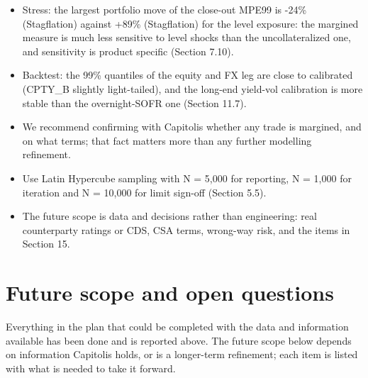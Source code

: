\documentclass[11pt,letterpaper]{article}
\begin{document}
\begin{itemize}
\item Stress: the largest portfolio move of the close-out MPE99 is -24\% (Stagflation) against +89\% (Stagflation) for the level exposure: the margined measure is much less sensitive to level shocks than the uncollateralized one, and sensitivity is product specific (Section 7.10).
\item Backtest: the 99\% quantiles of the equity and FX leg are close to calibrated (CPTY\_B slightly light-tailed), and the long-end yield-vol calibration is more stable than the overnight-SOFR one (Section 11.7).
\item We recommend confirming with Capitolis whether any trade is margined, and on what terms; that fact matters more than any further modelling refinement.
\item Use Latin Hypercube sampling with N = 5,000 for reporting, N = 1,000 for iteration and N = 10,000 for limit sign-off (Section 5.5).
\item The future scope is data and decisions rather than engineering: real counterparty ratings or CDS, CSA terms, wrong-way risk, and the items in Section 15.
\end{itemize}
\clearpage
\section{Future scope and open questions}
Everything in the plan that could be completed with the data and information available has been done and is reported above. The future scope below depends on information Capitolis holds, or is a longer-term refinement; each item is listed with what is needed to take it forward.
\end{document}
